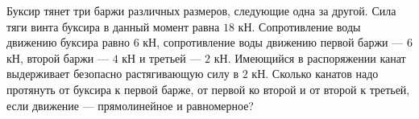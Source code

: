 Буксир тянет три баржи различных размеров, следующие одна за другой.
Сила тяги винта буксира в данный момент равна $18$ кН. Сопротивление
воды движению буксира равно $6$ кН, сопротивление воды движению первой
баржи --- $6$ кН, второй баржи --- $4$ кН и третьей --- $2$ кН.
Имеющийся в распоряжении канат выдерживает безопасно растягивающую силу
в $2$ кН. Сколько канатов надо протянуть от буксира к первой барже,
от первой ко второй и от второй к третьей, если движение ---
прямолинейное и равномерное?
